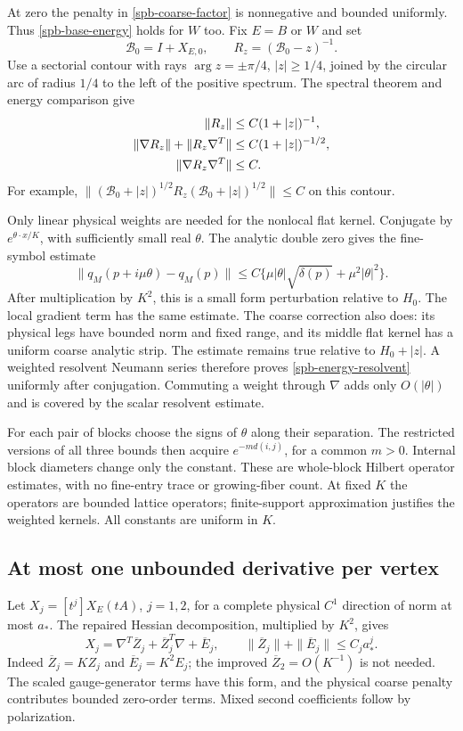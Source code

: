 At zero the penalty in \eqref{spb-coarse-factor} is nonnegative and
bounded uniformly. Thus \eqref{spb-base-energy} holds for $W$ too.
Fix $E=B$ or $W$ and set
\[
 \mathcal B_0=I+X_{E,0},\qquad R_z=(\mathcal B_0-z)^{-1}.
\]
Use a sectorial contour with rays $\arg z=\pm\pi/4$, $|z|\ge1/4$,
joined by the circular arc of radius $1/4$ to the left of the positive
spectrum. The spectral theorem and energy comparison give
\begin{align}
 \|R_z\|&\le C(1+|z|)^{-1},\notag\\
 \|\nabla R_z\|+\|R_z\nabla^T\|
      &\le C(1+|z|)^{-1/2},\notag\\
 \|\nabla R_z\nabla^T\|&\le C.
 \label{spb-energy-resolvent}
\end{align}
For example,
$\|(\mathcal B_0+|z|)^{1/2}R_z
(\mathcal B_0+|z|)^{1/2}\|\le C$ on this contour.

Only linear physical weights are needed for the nonlocal flat kernel.
Conjugate by $e^{\theta\cdot x/K}$, with sufficiently small real
$\theta$. The analytic double zero gives the fine-symbol estimate
\[
 \|q_M(p+i\mu\theta)-q_M(p)\|
 \le C\{\mu|\theta|\sqrt{\delta(p)}+\mu^2|\theta|^2\}.
\]
After multiplication by $K^2$, this is a small form perturbation
relative to $H_0$. The local gradient term has the same estimate.
The coarse correction also does: its physical legs have bounded norm
and fixed range, and its middle flat kernel has a uniform coarse
analytic strip. The estimate remains true relative to $H_0+|z|$.
A weighted resolvent Neumann series therefore proves
\eqref{spb-energy-resolvent} uniformly after conjugation.
Commuting a weight through $\nabla$ adds only $O(|\theta|)$ and
is covered by the scalar resolvent estimate.

For each pair of blocks choose the signs of $\theta$ along their
separation. The restricted versions of all three bounds then acquire
$e^{-m d(i,j)}$, for a common $m>0$. Internal block diameters change
only the constant. These are whole-block Hilbert operator estimates,
with no fine-entry trace or growing-fiber count. At fixed $K$ the
operators are bounded lattice operators; finite-support approximation
justifies the weighted kernels. All constants are uniform in $K$.

\subsection{At most one unbounded derivative per vertex}
\label{spb-vertices}

Let $X_j=[t^j]X_E(tA)$, $j=1,2$, for a complete physical $C^1$
direction of norm at most $a_*$. The repaired Hessian decomposition,
multiplied by $K^2$, gives
\begin{equation}
 X_j=\nabla^T\overline Z_j+\overline Z_j^T\nabla
                  +\overline E_j,
 \qquad
 \|\overline Z_j\|+\|\overline E_j\|\le C_j a_*^j.
 \label{spb-first-order}
\end{equation}
Indeed $\overline Z_j=KZ_j$ and $\overline E_j=K^2E_j$;
the improved $\overline Z_2=O(K^{-1})$ is not needed.
The scaled gauge-generator terms have this form, and the physical
coarse penalty contributes bounded zero-order terms. Mixed second
coefficients follow by polarization.

